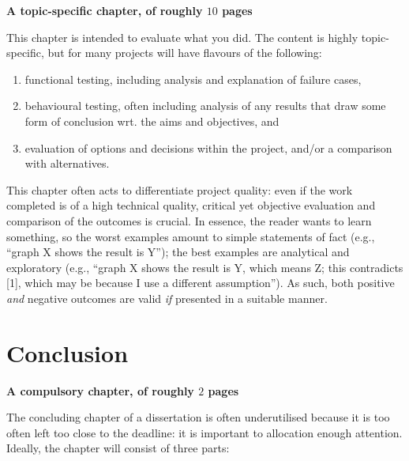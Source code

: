 \documentclass[ %
                    author={Dominic Joseph Moylett},
                supervisor={Dr. Raphael Clifford and Dr. Benjamin Sach},
                    degree={MEng},
                     title={Dictionary Matching with Fingerprints},
                  subtitle={An Empirical Analysis},
                      type={Research},
                      year={2014} ]{dissertation}
\begin{document}
{\bf A topic-specific chapter, of roughly $10$ pages} 
\vspace{1cm} 

\noindent
This chapter is intended to evaluate what you did.  The content is highly 
topic-specific, but for many projects will have flavours of the following:

\begin{enumerate}
\item functional  testing, including analysis and explanation of failure 
      cases,
\item behavioural testing, often including analysis of any results that 
      draw some form of conclusion wrt. the aims and objectives,
      and
\item evaluation of options and decisions within the project, and/or a
      comparison with alternatives.
\end{enumerate}

\noindent
This chapter often acts to differentiate project quality: even if the work
completed is of a high technical quality, critical yet objective evaluation 
and comparison of the outcomes is crucial.  In essence, the reader wants to
learn something, so the worst examples amount to simple statements of fact 
(e.g., ``graph X shows the result is Y''); the best examples are analytical 
and exploratory (e.g., ``graph X shows the result is Y, which means Z; this 
contradicts [1], which may be because I use a different assumption'').  As 
such, both positive {\em and} negative outcomes are valid {\em if} presented 
in a suitable manner.


\chapter{Conclusion}
\label{chap:conclusion}

{\bf A compulsory chapter, of roughly $2$ pages} 
\vspace{1cm} 

\noindent
The concluding chapter of a dissertation is often underutilised because it 
is too often left too close to the deadline: it is important to allocation
enough attention.  Ideally, the chapter will consist of three parts:
\end{document}
